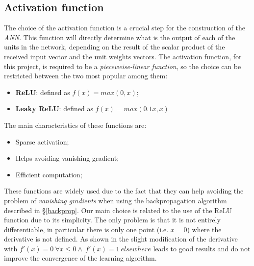 \subsection{Activation function}
The choice of the activation function is a crucial step for the construction of the \textit{ANN}. This function will directly determine what is the output of each of the units in the network, depending on the result of the scalar product of the received input vector and the unit weights vectors.\newline
The activation function, for this project, is required to be a \textit{pieceweise-linear function}, so the choice can be restricted between the two most popular among them:
\begin{itemize}
    \item \textbf{ReLU}: defined as $f(x) = max(0,x)$;
    \item \textbf{Leaky ReLU}: defined as $f(x) = max(0.1x, x)$
\end{itemize}
The main characteristics of these functions are:
\begin{itemize}
    \item Sparse activation;
    \item Helps avoiding vanishing gradient;
    \item Efficient computation;
\end{itemize}
These functions are widely used due to the fact that they can help avoiding the problem of \textit{vanishing gradients} when using the backpropagation algorithm described in \S\ref{backprop}. Our main choice is related to the use of the ReLU function due to its simplicity. The only problem is that it is not entirely differentiable, in particular there is only one point (i.e. $x=0$) where the derivative is not defined. As shown in  the slight modification of the derivative with $f'(x) = 0\ \forall x\leq0 \land \ f'(x) = 1\ elsewhere$ leads to good results and do not improve the convergence of the learning algorithm.

